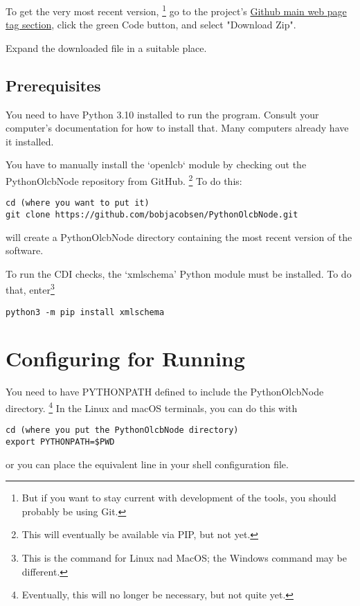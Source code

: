 \documentclass[11pt]{article}
\begin{document}
To get the very most recent version,
\footnote{But if you want to stay current with development of the tools, you should probably be using Git.}
go to the project's
\href{https://github.com/bobjacobsen/OlcbChecker}{Github main web page tag section},
click the green Code button, and select "Download Zip".

Expand the downloaded file in a suitable place.

\subsection{Prerequisites}

You need to have Python 3.10 installed to run the program. Consult your
computer's documentation for how to install that.  Many computers already
have it installed.

You have to manually install the `openlcb` module by checking out the 
PythonOlcbNode repository from GitHub.
\footnote{This will eventually be available via PIP, but not yet.}
To do this:
\begin{verbatim}
cd (where you want to put it)
git clone https://github.com/bobjacobsen/PythonOlcbNode.git
\end{verbatim}
will create a PythonOlcbNode directory containing the most recent version of the software.

To run the CDI checks, the `xmlschema' Python module must be installed. To do that, 
enter\footnote{This is the command for Linux nad MacOS; the Windows command may be different.}

\begin{verbatim}
python3 -m pip install xmlschema
\end{verbatim}

\section{Configuring for Running}

You need to have PYTHONPATH defined to include the PythonOlcbNode directory.
\footnote{Eventually, this will no longer be necessary, but not quite yet.}
In the Linux and macOS
terminals, you can do this with

\begin{verbatim}
cd (where you put the PythonOlcbNode directory)
export PYTHONPATH=$PWD
\end{verbatim}

or you can place the equivalent line in your shell configuration file.
\end{document}

